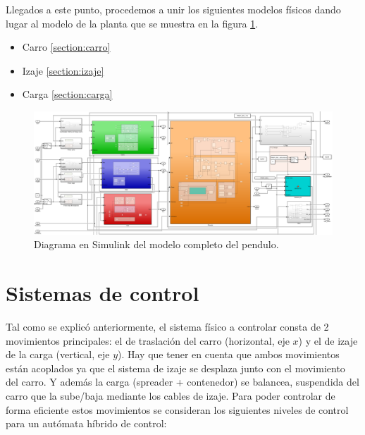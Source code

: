 \documentclass[11pt]{article}
\begin{document}
\newpage

Llegados a este punto, procedemos a unir los siguientes modelos físicos dando lugar al modelo de la planta que se muestra en la figura \ref{fig:sistema_completo}.
\begin{itemize}
	\item Carro \ref{section:carro}
	\item Izaje \ref{section:izaje}
	\item Carga \ref{section:carga}
\end{itemize}

\begin{figure}[h!]
	\centering
	\includegraphics[width=1\textwidth]{images/imagen_11_sistema_completo.png}
	\caption{Diagrama en Simulink del modelo completo del pendulo.}
	\label{fig:sistema_completo}
\end{figure}



\section{Sistemas de control}

Tal como se explicó anteriormente, el sistema físico a controlar consta de 2 movimientos principales: el de traslación del carro (horizontal, eje $x$) y el de izaje de la carga (vertical, eje $y$). Hay que tener en cuenta que ambos movimientos están acoplados ya que el sistema de izaje se desplaza junto con el movimiento del carro. Y además la carga (spreader + contenedor) se balancea, suspendida del carro que la sube/baja mediante los cables de izaje. Para poder controlar de forma eficiente estos movimientos se consideran los siguientes niveles de control para un autómata híbrido de control:
\end{document}

